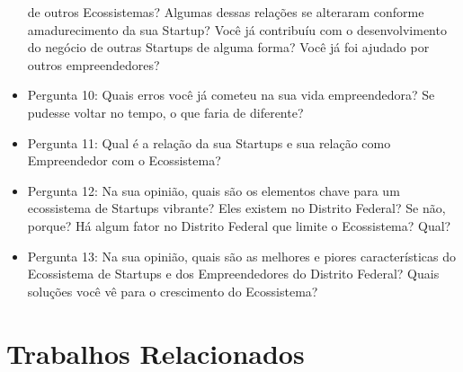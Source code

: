 \begin{itemize}
  de outros Ecossistemas? Algumas dessas relações se alteraram conforme amadurecimento da sua Startup? Você já contribuíu com o desenvolvimento do negócio de outras Startups de alguma forma? Você
  já foi ajudado por outros empreendedores?
  \item Pergunta 10: Quais erros você já cometeu na sua vida empreendedora? Se pudesse voltar no tempo, o que faria de diferente?
  \item Pergunta 11: Qual é a relação da sua Startups e sua relação como Empreendedor com o Ecossistema?
  \item Pergunta 12: Na sua opinião, quais são os elementos chave para um ecossistema de Startups vibrante? Eles existem no Distrito Federal? Se não, porque? Há algum fator no Distrito Federal que
  limite o Ecossistema? Qual?
  \item Pergunta 13: Na sua opinião, quais são as melhores e piores características do Ecossistema de Startups e dos Empreendedores do Distrito Federal? Quais soluções você vê para o crescimento do
  Ecossistema?
\end{itemize}

\section{Trabalhos Relacionados}
\label{section:trabalhos_relacionados}
